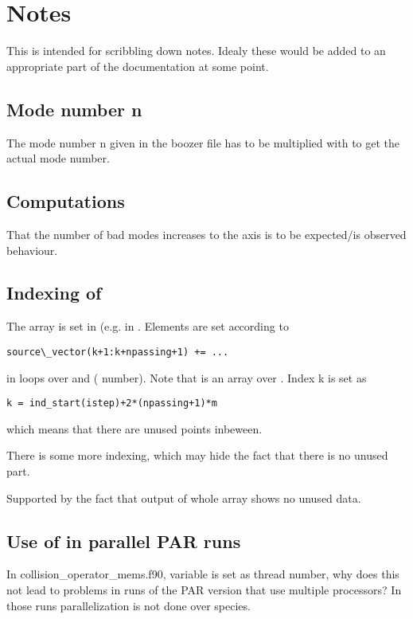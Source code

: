 \chapter{Notes}
This is intended for scribbling down notes.
Idealy these would be added to an appropriate part of the documentation
at some point.

\section{Mode number n}
The mode number n given in the boozer file has to be multiplied with
 to get the actual mode number.

\section{Computations}
That the number of bad modes increases to the axis is to be expected/is observed behaviour.

\section{Indexing of }
The array  is set in
 (e.g. in .
Elements are set according to
\begin{verbatim}
source\_vector(k+1:k+npassing+1) += ...
\end{verbatim}
in loops over  and  ( number).
Note that  is an array over .
Index k is set as
\begin{verbatim}
k = ind_start(istep)+2*(npassing+1)*m
\end{verbatim}
which means that there are  unused points inbeween.

There is some more indexing, which may hide the fact that there is no
unused part.

Supported by the fact that output of whole array shows no unused data.

\section{Use of  in parallel PAR runs}
In collision\_operator\_mems.f90, variable  is set
as thread number, why does this not lead to problems in runs of the PAR
version that use multiple processors? In those runs parallelization is
not done over species.
